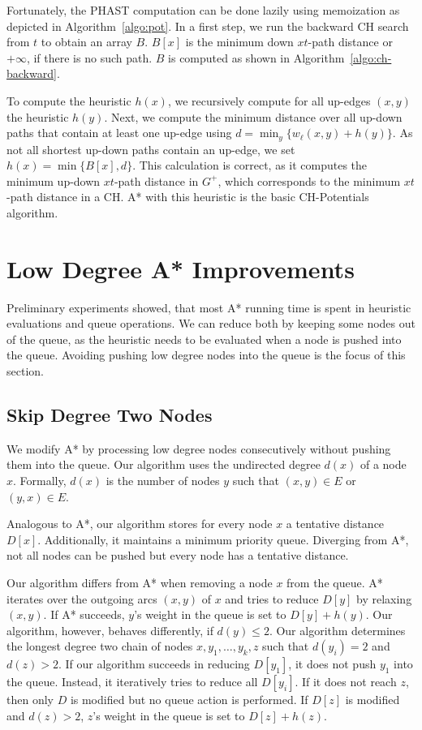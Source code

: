 \documentclass[a4paper,USenglish,cleveref, autoref, thm-restate]{lipics-v2019}
\begin{document}
Fortunately, the PHAST computation can be done lazily using memoization as depicted in Algorithm~\ref{algo:pot}.
In a first step, we run the backward CH search from $t$ to obtain an array $B$.
$B[x]$ is the minimum down $xt$-path distance or $+\infty$, if there is no such path.
$B$ is computed as shown in Algorithm~\ref{algo:ch-backward}.

To compute the heuristic $h(x)$, we recursively compute for all up-edges $(x,y)$ the heuristic $h(y)$.
Next, we compute the minimum distance over all up-down paths that contain at least one up-edge using $d = \min_y\{w_\ell(x,y) + h(y)\}$.
As not all shortest up-down paths contain an up-edge, we set $h(x) = \min \{ B[x], d \}$.
This calculation is correct, as it computes the minimum up-down $xt$-path distance in $G^+$, which corresponds to the minimum $xt$-path distance in a CH.
A* with this heuristic is the basic CH-Potentials algorithm.

\section{Low Degree A* Improvements}

\label{sec:low-deg-improvment}

Preliminary experiments showed, that most A* running time is spent in heuristic evaluations and queue operations.
We can reduce both by keeping some nodes out of the queue, as the heuristic needs to be evaluated when a node is pushed into the queue.
Avoiding pushing low degree nodes into the queue is the focus of this section.

\subsection{Skip Degree Two Nodes}

We modify A* by processing low degree nodes consecutively without pushing them into the queue.
Our algorithm uses the undirected degree $d(x)$ of a node $x$.
Formally, $d(x)$ is the number of nodes $y$ such that $(x,y)\in E$ or $(y,x)\in E$.

Analogous to A*, our algorithm stores for every node $x$ a tentative distance $D[x]$.
Additionally, it maintains a minimum priority queue.
Diverging from A*, not all nodes can be pushed but every node has a tentative distance.

Our algorithm differs from A* when removing a node $x$ from the queue.
A* iterates over the outgoing arcs $(x,y)$ of $x$ and tries to reduce $D[y]$ by relaxing $(x,y)$.
If A* succeeds, $y$'s weight in the queue is set to $D[y]+h(y)$.
Our algorithm, however, behaves differently, if $d(y)\le 2$.
Our algorithm determines the longest degree two chain of nodes $x,y_1,\ldots, y_k, z$ such that $d(y_i)=2$ and $d(z) > 2$.
If our algorithm succeeds in reducing $D[y_1]$, it does not push $y_1$ into the queue.
Instead, it iteratively tries to reduce all $D[y_i]$.
If it does not reach $z$, then only $D$ is modified but no queue action is performed.
If $D[z]$ is modified and $d(z)>2$, $z$'s weight in the queue is set to $D[z]+h(z)$.
\end{document}
